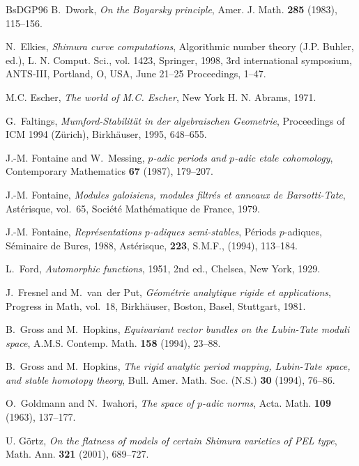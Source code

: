 \begin{thebibliography}{BsDGP96}
B.~Dwork, \emph{On the Boyarsky principle}, Amer. J. Math. \textbf{285} (1983),
  115--156.

N.~Elkies, \emph{Shimura curve computations}, Algorithmic number theory (J.P.
  Buhler, ed.), L. N. Comput. Sci., vol. 1423, Springer, 1998, 3rd
  international symposium, ANTS-III, Portland, O, USA, June 21--25 Proceedings,
  1--47.

M.C. Escher, \emph{The world of M.C. Escher}, New York H. N. Abrams, 1971.

G.~Faltings, \emph{Mumford-Stabilit\"at in der algebraischen Geometrie},
  Proceedings of ICM 1994 (Z\"urich), Birkh\"auser, 1995, 648--655.

J.-M. Fontaine and W.~Messing, \emph{$p$-adic periods and $p$-adic etale
  cohomology}, Contemporary Mathematics \textbf{67} (1987), 179--207.

J.-M. Fontaine, \emph{Modules galoisiens, modules filtr\'es et anneaux de
  {B}arsotti-{T}ate}, Ast\'erisque, vol.~65, Soci\'et\'e Math\'ematique de
  France, 1979.

J.-M. Fontaine,
\emph{Repr\'esentations $p$-adiques semi-stables},
P\'eriods $p$-adiques, S\'eminaire de {B}ures, 1988,
Ast\'erisque, \textbf{223}, S.M.F., (1994), 113--184.

L.~Ford, \emph{Automorphic functions}, 1951, 2nd ed., Chelsea, New York, 1929.

J.~Fresnel and M.~van~der Put, \emph{G\'eom\'etrie analytique rigide et
  applications}, Progress in Math, vol.~18, Birkh\"auser, Boston, Basel,
  Stuttgart, 1981.

B.~Gross and M.~Hopkins, \emph{Equivariant vector bundles on the Lubin-Tate
  moduli space}, A.M.S. Contemp. Math. \textbf{158} (1994), 23--88.

B.~Gross and M.~Hopkins, \emph{The rigid analytic period mapping,
  {L}ubin-{T}ate space, and stable homotopy theory}, Bull. Amer. Math. Soc.
  (N.S.) \textbf{30} (1994), 76--86.

O.~Goldmann and N.~Iwahori, \emph{The space of $p$-adic norms}, Acta. Math.
  \textbf{109} (1963), 137--177.

U. G\"ortz, \emph{On the flatness of models of certain Shimura varieties of PEL type}, Math. Ann. \textbf{321} (2001), 689--727.


\end{thebibliography}
